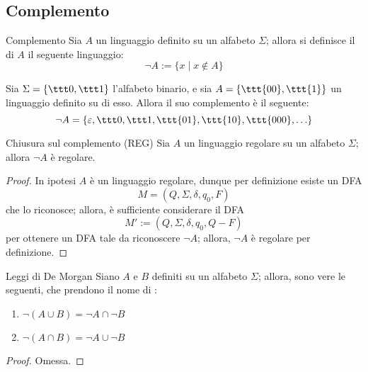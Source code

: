 \documentclass[a4paper, 12pt]{report}
\begin{document}
    \subsection{Complemento}

    \begin{frameddefn}{Complemento}
        Sia $A$ un linguaggio definito su un alfabeto $\Sigma$; allora si definisce il  di $A$ il seguente linguaggio: $$\lnot A := \{x \mid x \notin A\}$$
    \end{frameddefn}

    \begin{example}[Complemento]
        Sia $\Sigma = \{\ttt 0, \ttt 1\}$ l'alfabeto binario, e sia $A = \{ \ttt{00}, \ttt{1}\}$ un linguaggio definito su di esso. Allora il suo complemento è il seguente: $$\lnot A = \{\varepsilon, \ttt 0, \ttt 1, \ttt{01}, \ttt{10}, \ttt{000}, \ldots\}$$
    \end{example}

    \begin{framedprop}{Chiusura sul complemento (REG)}
        Sia $A$ un linguaggio regolare su un alfabeto $\Sigma$; allora $\lnot A$ è regolare.
    \end{framedprop}

    \begin{proof}
        In ipotesi $A$ è un linguaggio regolare, dunque per definizione esiste un DFA $$M = (Q, \Sigma, \delta, q_0, F)$$ che lo riconosce; allora, è sufficiente considerare il DFA $$M' := (Q, \Sigma, \delta, q_0, Q-F)$$ per ottenere un DFA tale da riconoscere $\lnot A$; allora, $\lnot A$ è regolare per definizione.
    \end{proof}

    \begin{framedprop}{Leggi di De Morgan}
        Siano $A$ e $B$ definiti su un alfabeto $\Sigma$; allora, sono vere le seguenti, che prendono il nome di :

        \begin{enumerate}[label=\roman*), font=\itshape]
            \item $\lnot (A \cup B) = \lnot A \cap \lnot B$
            \item $\lnot (A \cap B) = \lnot A \cup \lnot B$
        \end{enumerate}
    \end{framedprop}

    \begin{proof}
        Omessa.
    \end{proof}
\end{document}
